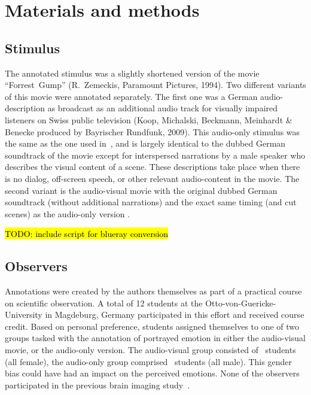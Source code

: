 \section*{Materials and methods} 

\subsection*{Stimulus}

The annotated stimulus was a slightly shortened version of the movie
``Forrest~Gump'' (R.~Zemeckis, Paramount Pictures, 1994). Two different
variants of this movie were annotated separately. The first one was a German
audio-description as broadcast as an additional audio track for visually
impaired listeners on Swiss public television (Koop, Michalski, Beckmann,
Meinhardt \& Benecke produced by Bayrischer Rundfunk, 2009). This audio-only
stimulus was the same as the one used in~\cite{HBI+14}, and is largely
identical to the dubbed German soundtrack of the movie except for interspersed
narrations by a male speaker who describes the visual content of a scene. These
descriptions take place when there is no dialog, off-screen speech, or other
relevant audio-content in the movie. The second variant is the audio-visual
movie with the original dubbed German soundtrack (without additional
narrations) and the exact same timing (and cut scenes) as the audio-only
version \cite[contains instructions on how to reproduce the stimulus from the
DVD release]{HBI+14}.

\hl{TODO: include script for blueray conversion}

\subsection*{Observers}

Annotations were created by the authors themselves as part of a practical
course on scientific observation. A total of 12 students at the
Otto-von-Guericke-University in Magdeburg, Germany participated in this effort
and received course credit.  Based on personal preference, students assigned
themselves to one of two groups tasked with the annotation of portrayed emotion
in either the audio-visual movie, or the audio-only version. The audio-visual
group consisted of \AVTotalRaters\ students (all female), the audio-only group
comprised \AOTotalRaters\ students (all male). This gender bias could have had
an impact on the perceived emotions.  None of the observers participated in the
previous brain imaging study~\cite{HBI+14}.


